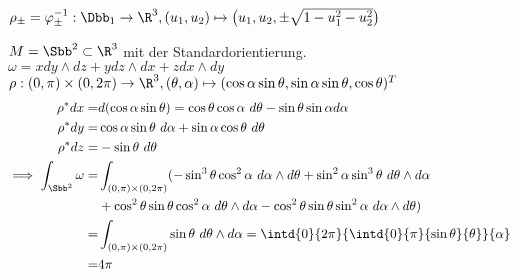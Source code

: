\begin{exmp*}
	\( \rho_\pm = \varphi_\pm^{-1}: \Dbb_1 \to \R^3, (u_1,u_2) \mapsto \big(u_1,u_2,\pm\sqrt{1-u_1^2-u_2^2}\big) \)
\end{exmp*}


\begin{exmp*}
	\( M = \Sbb^2 \subset \R^3 \) mit der Standardorientierung.\\
	\( \omega = xdy \wedge dz + y dz \wedge dx + z dx \wedge dy \)\\
	\( \rho: (0,\pi) \times (0,2\pi) \to \R^3, (\theta,\alpha) \mapsto (\cos\alpha\sin\theta,\sin\alpha\sin\theta,\cos\theta)^T \)
	\begin{align*}
		\rho^*dx =& d(\cos\alpha\sin\theta) = \cos\theta\cos\alpha\ d \theta - \sin\theta\sin\alpha d\alpha\\
		\rho^*dy =& \cos\alpha\sin\theta\ d\alpha + \sin\alpha\cos\theta\ d\theta\\
		\rho^*dz =& -\sin\theta\ d\theta\\
		\implies \int_{\Sbb^2} \omega =& \int_{(0,\pi)\times(0,2\pi)} (-\sin^3\theta \cos^2\alpha\ d\alpha \wedge d\theta + \sin^2\alpha\sin^3\theta\ d\theta \wedge d\alpha \\
			&+ \cos^2\theta\sin\theta\cos^2\alpha\ d\theta \wedge d\alpha -\cos^2\theta\sin\theta\sin^2\alpha\ d\alpha \wedge d\theta)\\
		=& \int_{(0,\pi)\times(0,2\pi)} \sin\theta\ d\theta \wedge d\alpha = \intd{0}{2\pi}{\intd{0}{\pi}{\sin\theta}{\theta}}{\alpha}\\
		=& 4\pi
	\end{align*}
\end{exmp*}